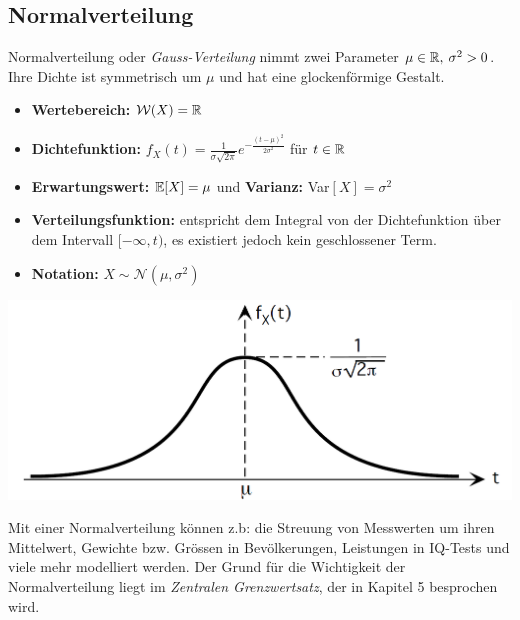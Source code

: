 \subsection{Normalverteilung}
Normalverteilung oder \textit{Gauss-Verteilung} nimmt zwei Parameter $\mu \in \mathbb{R},\: \sigma^2 > 0$. Ihre Dichte ist symmetrisch um $\mu$ und hat eine glockenförmige Gestalt.
\begin{itemize}
\item \textbf{Wertebereich:} $\mathcal{W}(X) = \mathbb{R}$
\item \textbf{Dichtefunktion:} $f_X(t) = \frac{1}{\sigma \sqrt{2\pi}}e^{- \frac{(t-\mu)^2}{2\sigma^2}}$ für $t\in \mathbb{R}$
\item \textbf{Erwartungswert:} $\mathbb{E}[X] = \mu$ und \textbf{Varianz:} Var$[X] = \sigma^2$
\item \textbf{Verteilungsfunktion:} entspricht dem Integral von der Dichtefunktion über dem Intervall $[-\infty, t)$, es existiert jedoch kein geschlossener Term.
\item \textbf{Notation:} $X \sim \mathcal{N}(\mu, \sigma^2)$
\end{itemize}
\begin{center}
\includegraphics[scale=0.3]{normalverteilung.png}
\end{center}
Mit einer Normalverteilung können z.b: die Streuung von Messwerten um ihren Mittelwert, Gewichte bzw. Grössen in Bevölkerungen, Leistungen in IQ-Tests und viele mehr modelliert werden. Der Grund für die Wichtigkeit der Normalverteilung liegt im \textit{Zentralen Grenzwertsatz}, der in Kapitel 5 besprochen wird.

